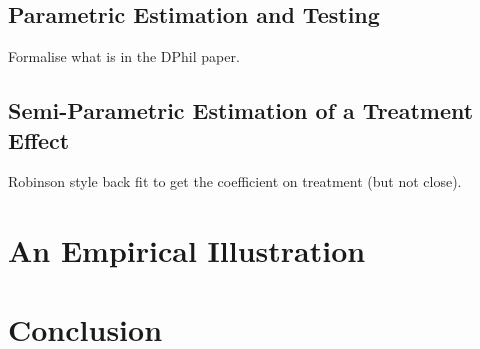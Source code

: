 \documentclass{article}
\begin{document}
\subsection{Parametric Estimation and Testing}
Formalise what is in the DPhil paper.

\subsection{Semi-Parametric Estimation of a Treatment Effect}
Robinson style back fit to get the coefficient on treatment (but not close).

\section{An Empirical Illustration}
\section{Conclusion}


\end{document}
